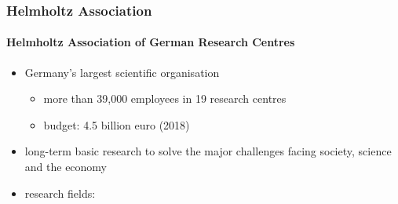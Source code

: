 \documentclass[10pt,t]{beamer}
\begin{document}
\begin{frame}
\frametitle{Helmholtz Association}
\framesubtitle{Helmholtz Association of German Research Centres}
\vspace*{-1.5\baselineskip}
\begin{itemize}
    \item Germany's largest scientific organisation
    \begin{itemize}
        \item more than 39,000 employees in 19 research centres
        \item budget: 4.5 billion euro (2018)
    \end{itemize}
    \item long-term basic research to solve the major challenges facing society, science and the economy
    \item research fields:
\end{itemize}


\end{frame}
\end{document}
